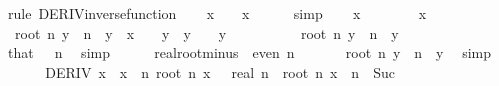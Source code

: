 \begin{isabellebody}
%
\isadelimproof
%
\endisadelimproof
%
\isatagproof
{}\isamarkupfalse%
\ {\isacharparenleft}{\kern0pt}rule\ DERIV{\isacharunderscore}{\kern0pt}inverse{\isacharunderscore}{\kern0pt}function{\isacharparenright}{\kern0pt}\isanewline
\ \ \isamarkupfalse%
\ {\isachardoublequoteopen}x\ {\isacharminus}{\kern0pt}\ {}\ {\isacharless}{\kern0pt}\ x{\isachardoublequoteclose}\isanewline
\ \ \ \ \isamarkupfalse%
\ simp\isanewline
\ \ \isamarkupfalse%
\ {\isachardoublequoteopen}x\ {\isacharless}{\kern0pt}\ {}{\isachardoublequoteclose}\isanewline
\ \ \ \ \isamarkupfalse%
\ x\ \isacommand{{\isachardot}{\kern0pt}}\isamarkupfalse%
\isanewline
\ \ \isamarkupfalse%
\ {\isachardoublequoteopen}{\isacharminus}{\kern0pt}\ {\isacharparenleft}{\kern0pt}root\ n\ y\ {\isacharcircum}{\kern0pt}\ n{\isacharparenright}{\kern0pt}\ {\isacharequal}{\kern0pt}\ y{\isachardoublequoteclose}\ \ {\isachardoublequoteopen}x\ {\isacharminus}{\kern0pt}\ {}\ {\isacharless}{\kern0pt}\ y{\isachardoublequoteclose}\ \ {\isachardoublequoteopen}y\ {\isacharless}{\kern0pt}\ {}{\isachardoublequoteclose}\ \ y\isanewline
\ \ \isamarkupfalse%
\ {\isacharminus}{\kern0pt}\isanewline
\ \ \ \ \isamarkupfalse%
\ {\isachardoublequoteopen}root\ n\ {\isacharparenleft}{\kern0pt}{\isacharminus}{\kern0pt}y{\isacharparenright}{\kern0pt}\ {\isacharcircum}{\kern0pt}\ n\ {\isacharequal}{\kern0pt}\ {\isacharminus}{\kern0pt}y{\isachardoublequoteclose}\ \isanewline
\ \ \ \ \ \ \isamarkupfalse%
\ that\ {\isacartoucheopen}{}\ {\isacharless}{\kern0pt}\ n{\isacartoucheclose}\ \isamarkupfalse%
\ simp\isanewline
\ \ \ \ \isamarkupfalse%
\ real{\isacharunderscore}{\kern0pt}root{\isacharunderscore}{\kern0pt}minus\ \ {\isacartoucheopen}even\ n{\isacartoucheclose}\isanewline
\ \ \ \ \isamarkupfalse%
\ {\isachardoublequoteopen}{\isacharminus}{\kern0pt}\ {\isacharparenleft}{\kern0pt}root\ n\ y\ {\isacharcircum}{\kern0pt}\ n{\isacharparenright}{\kern0pt}\ {\isacharequal}{\kern0pt}\ y{\isachardoublequoteclose}\ \isamarkupfalse%
\ simp\isanewline
\ \ \isamarkupfalse%
\isanewline
\ \ \isamarkupfalse%
\ {\isachardoublequoteopen}DERIV\ {\isacharparenleft}{\kern0pt}{\isasymlambda}x{\isachardot}{\kern0pt}\ {\isacharminus}{\kern0pt}\ {\isacharparenleft}{\kern0pt}x\ {\isacharcircum}{\kern0pt}\ n{\isacharparenright}{\kern0pt}{\isacharparenright}{\kern0pt}\ {\isacharparenleft}{\kern0pt}root\ n\ x{\isacharparenright}{\kern0pt}\ {\isacharcolon}{\kern0pt}{\isachargreater}{\kern0pt}\ {\isacharminus}{\kern0pt}\ real\ n\ {\isacharasterisk}{\kern0pt}\ root\ n\ x\ {\isacharcircum}{\kern0pt}\ {\isacharparenleft}{\kern0pt}n\ {\isacharminus}{\kern0pt}\ Suc\ {}{\isacharparenright}{\kern0pt}{\isachardoublequoteclose}\isanewline

\end{isabellebody}
